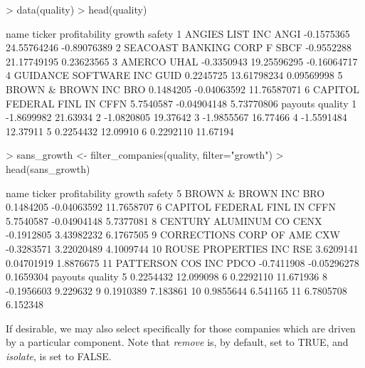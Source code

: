 \documentclass[titlepage]{article}
\begin{document}
\begin{Schunk}
\begin{Sinput}
> data(quality)
> head(quality)
\end{Sinput}
\begin{Soutput}
                     name ticker profitability      growth      safety
1         ANGIES LIST INC   ANGI    -0.1575365 24.55764246 -0.89076389
2 SEACOAST BANKING CORP F   SBCF    -0.9552288 21.17749195  0.23623565
3                  AMERCO   UHAL    -0.3350943 19.25596295 -0.16064717
4   GUIDANCE SOFTWARE INC   GUID     0.2245725 13.61798234  0.09569998
5       BROWN & BROWN INC    BRO     0.1484205 -0.04063592 11.76587071
6 CAPITOL FEDERAL FINL IN   CFFN     5.7540587 -0.04904148  5.73770806
     payouts  quality
1 -1.8699982 21.63934
2 -1.0820805 19.37642
3 -1.9855567 16.77466
4 -1.5591484 12.37911
5  0.2254432 12.09910
6  0.2292110 11.67194
\end{Soutput}
\begin{Sinput}
> sans_growth <- filter_companies(quality, filter="growth")
> head(sans_growth)
\end{Sinput}
\begin{Soutput}
                      name ticker profitability      growth     safety
5        BROWN & BROWN INC    BRO     0.1484205 -0.04063592 11.7658707
6  CAPITOL FEDERAL FINL IN   CFFN     5.7540587 -0.04904148  5.7377081
8      CENTURY ALUMINUM CO   CENX    -0.1912805  3.43982232  6.1767505
9  CORRECTIONS CORP OF AME    CXW    -0.3283571  3.22020489  4.1009744
10    ROUSE PROPERTIES INC    RSE     3.6209141  0.04701919  1.8876675
11       PATTERSON COS INC   PDCO    -0.7411908 -0.05296278  0.1659304
      payouts   quality
5   0.2254432 12.099098
6   0.2292110 11.671936
8  -0.1956603  9.229632
9   0.1910389  7.183861
10  0.9855644  6.541165
11  6.7805708  6.152348
\end{Soutput}
\end{Schunk}

If desirable, we may also select specifically for those companies which are driven by a particular component. Note that \textit{remove} is, by default, set to TRUE, and \textit{isolate}, is set to FALSE.
\end{document}
